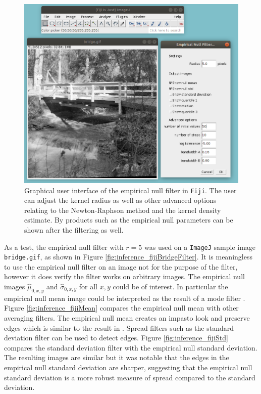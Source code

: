 \begin{figure}
    \centering
    \includegraphics[width=\textwidth]{../figures/inference/fiji/gui.png}
    \caption{Graphical user interface of the empirical null filter in \texttt{Fiji}. The user can adjust the kernel radius as well as other advanced options relating to the Newton-Raphson method and the kernel density estimate. By products such as the empirical null parameters can be shown after the filtering as well.}
    \label{fig:inference_fijiGui}
\end{figure}

As a test, the empirical null filter with $r=5$ was used on a \texttt{ImageJ} sample image \texttt{bridge.gif}, as shown in Figure \ref{fig:inference_fijiBridgeFilter}. It is meaningless to use the empirical null filter on an image not for the purpose of the filter, however it does verify the filter works on arbitrary images. The empirical null images $\widehat{\mu}_{0,x,y}$ and $\widehat{\sigma}_{0,x,y}$ for all ${x,y}$ could be of interest. In particular the empirical null mean image could be interpreted as the result of a mode filter \citep{griffin2000mean}. Figure \ref{fig:inference_fijiMean} compares the empirical null mean with other averaging filters. The empirical null mean creates an impasto look and preserve edges which is similar to the result in \cite{griffin2000mean}. Spread filters such as the standard deviation filter can be used to detect edges. Figure \ref{fig:inference_fijiStd} compares the standard deviation filter with the empirical null standard deviation. The resulting images are similar but it was notable that the edges in the empirical null standard deviation are sharper, suggesting that the empirical null standard deviation is a more robust measure of spread compared to the standard deviation.

